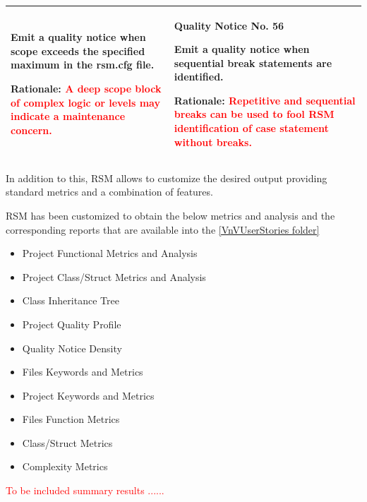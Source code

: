 {\begin{longtable}{||p{}|p{}||}
Emit a quality notice when scope exceeds the specified maximum in the rsm.cfg file. 
 
Rationale: \textcolor{red}{A deep scope block of complex logic or levels may indicate a maintenance concern.}
 & \textbf{Quality Notice No. 56}
 
Emit a quality notice when sequential break statements are identified.

Rationale: \textcolor{red}{Repetitive and sequential breaks can be used to fool RSM identification of case statement without breaks.}
    \\
    \hline
\end{longtable}}

In addition to this, RSM allows to customize the desired output providing standard metrics
and a combination of features.

RSM has been customized to obtain the below metrics and analysis and the corresponding reports that are available into the \href{https://github.com/openETCS/validation/tree/master/VnVUserStories/VnVUserStorySQS/04-Results}{[VnVUserStories folder]}

\begin{itemize}
\item Project Functional Metrics and Analysis
\item Project Class/Struct Metrics and Analysis
\item Class Inheritance Tree
\item Project Quality Profile
\item Quality Notice Density
\item Files Keywords and Metrics
\item Project Keywords and Metrics
\item Files Function Metrics
\item Class/Struct Metrics
\item Complexity Metrics
\end{itemize}


\textcolor{red}{To be included summary results ......}
           

